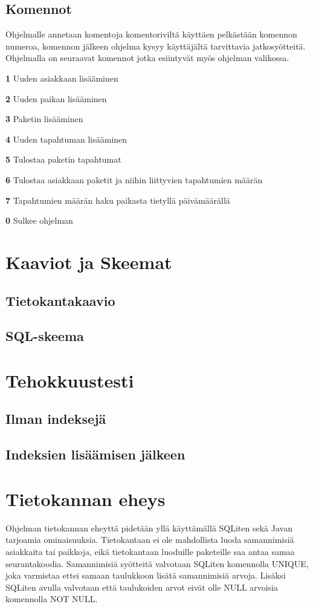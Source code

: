 \documentclass[11pt,a4paper]{article}
\begin{document}
\subsection*{Komennot}
Ohjelmalle annetaan komentoja komentoriviltä käyttäen pelkästään komennon numeroa, komennon jälkeen ohjelma kysyy käyttäjältä tarvittavia jatkosyötteitä. Ohjelmalla on seuraavat komennot jotka esiintyvät myös ohjelman valikossa.
\begin{description}
\item \textbf{1} Uuden asiakkaan lisääminen
\item \textbf{2} Uuden paikan lisääminen
\item \textbf{3} Paketin lisääminen
\item \textbf{4} Uuden tapahtuman lisääminen
\item \textbf{5} Tulostaa paketin tapahtumat
\item \textbf{6} Tulostaa asiakkaan paketit ja niihin liittyvien tapahtumien määrän
\item \textbf{7} Tapahtumien määrän haku paikasta tietyllä päivämäärällä
\item \textbf{0} Sulkee ohjelman 
\end{description}

\newpage
\section{Kaaviot ja Skeemat}
\subsection*{Tietokantakaavio}


\subsection*{SQL-skeema}

\newpage
\section{Tehokkuustesti}
\subsection*{Ilman indeksejä}
\subsection*{Indeksien lisäämisen jälkeen}

\newpage
\section{Tietokannan eheys}
Ohjelman tietokannan eheyttä pidetään yllä käyttämällä SQLiten sekä Javan tarjoamia ominaisuuksia.
Tietokantaan ei ole mahdollista luoda samannimisiä asiakkaita tai paikkoja, eikä tietokantaan luoduille paketeille saa antaa samaa seurantakoodia. Samannimisiä syötteitä valvotaan SQLiten komennolla UNIQUE, joka varmistaa ettei samaan taulukkoon lisätä samannimisiä arvoja. Lisäksi SQLiten avulla valvotaan että taulukoiden arvot eivät olle NULL arvoisia komennolla NOT NULL.
 
\end{document}
